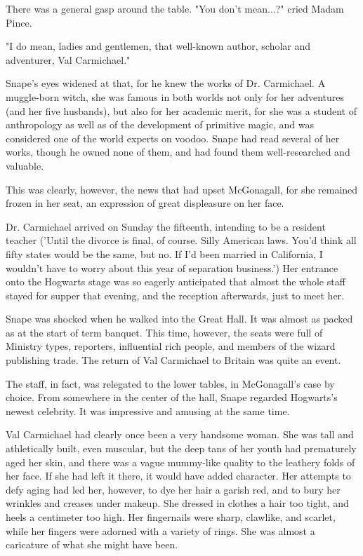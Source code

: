 There was a general gasp around the table. "You don't mean...?" cried Madam Pince.

"I do mean, ladies and gentlemen, that well-known author, scholar and adventurer, Val Carmichael."

Snape's eyes widened at that, for he knew the works of Dr. Carmichael. A muggle-born witch, she was famous in both worlds not only for her adventures (and her five husbands), but also for her academic merit, for she was a student of anthropology as well as of the development of primitive magic, and was considered one of the world experts on voodoo. Snape had read several of her works, though he owned none of them, and had found them well-researched and valuable.

This was clearly, however, the news that had upset McGonagall, for she remained frozen in her seat, an expression of great displeasure on her face.

Dr. Carmichael arrived on Sunday the fifteenth, intending to be a resident teacher ('Until the divorce is final, of course. Silly American laws. You'd think all fifty states would be the same, but no. If I'd been married in California, I wouldn't have to worry about this year of separation business.') Her entrance onto the Hogwarts stage was so eagerly anticipated that almost the whole staff stayed for supper that evening, and the reception afterwards, just to meet her.

Snape was shocked when he walked into the Great Hall. It was almost as packed as at the start of term banquet. This time, however, the seats were full of Ministry types, reporters, influential rich people, and members of the wizard publishing trade. The return of Val Carmichael to Britain was quite an event.

The staff, in fact, was relegated to the lower tables, in McGonagall's case by choice. From somewhere in the center of the hall, Snape regarded Hogwarts's newest celebrity. It was impressive and amusing at the same time.

Val Carmichael had clearly once been a very handsome woman. She was tall and athletically built, even muscular, but the deep tans of her youth had prematurely aged her skin, and there was a vague mummy-like quality to the leathery folds of her face. If she had left it there, it would have added character. Her attempts to defy aging had led her, however, to dye her hair a garish red, and to bury her wrinkles and creases under makeup. She dressed in clothes a hair too tight, and heels a centimeter too high. Her fingernails were sharp, clawlike, and scarlet, while her fingers were adorned with a variety of rings. She was almost a caricature of what she might have been.

